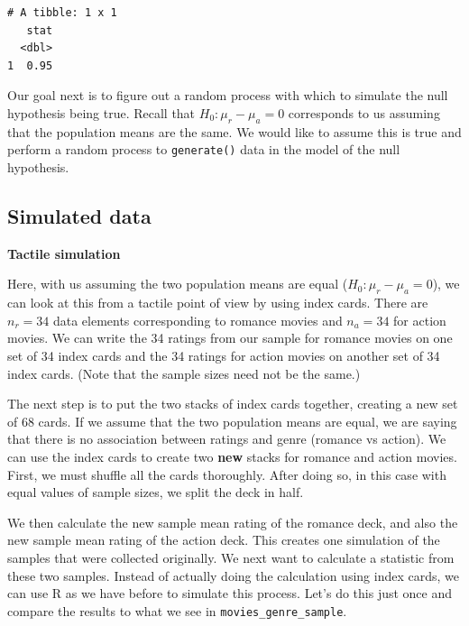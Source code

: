 \documentclass[12pt,]{krantz}
\makeatletter
\newenvironment{Shaded}{\begin{snugshade}}{\end{snugshade}}
\newcommand{\KeywordTok}[1]{\textcolor[rgb]{0.27,0.27,0.27}{\textbf{#1}}}
\newcommand{\DataTypeTok}[1]{\textcolor[rgb]{0.27,0.27,0.27}{#1}}
\newcommand{\StringTok}[1]{\textcolor[rgb]{0.5,0.5,0.5}{#1}}
\newcommand{\CommentTok}[1]{\textcolor[rgb]{0.37,0.37,0.37}{\textit{#1}}}
\newcommand{\OperatorTok}[1]{\textcolor[rgb]{0.43,0.43,0.43}{\textbf{#1}}}
\newcommand{\NormalTok}[1]{#1}
\newenvironment{kframe}{%
\medskip{}
\setlength{\fboxsep}{.8em}
 \def\at@end@of@kframe{}%
 \ifinner\ifhmode%
  \def\at@end@of@kframe{\end{minipage}}%
  \begin{minipage}{\columnwidth}%
 \fi\fi%
 \def\FrameCommand##1{\hskip\@totalleftmargin \hskip-\fboxsep
 \colorbox{shadecolor}{##1}\hskip-\fboxsep
     \hskip-\linewidth \hskip-\@totalleftmargin \hskip\columnwidth}%
 \MakeFramed {\advance\hsize-\width
   \@totalleftmargin\z@ \linewidth\hsize
   \@setminipage}}%
 {\par\unskip\endMakeFramed%
 \at@end@of@kframe}
\renewenvironment{Shaded}{\begin{kframe}}{\end{kframe}}
\makeatother
\begin{document}
\begin{verbatim}
# A tibble: 1 x 1
   stat
  <dbl>
1  0.95
\end{verbatim}

Our goal next is to figure out a random process with which to simulate
the null hypothesis being true. Recall that \(H_0: \mu_r - \mu_a = 0\)
corresponds to us assuming that the population means are the same. We
would like to assume this is true and perform a random process to
\texttt{generate()} data in the model of the null hypothesis.

\subsection{Simulated data}\label{simulated-data}

\textbf{Tactile simulation}

Here, with us assuming the two population means are equal
(\(H_0: \mu_r - \mu_a = 0\)), we can look at this from a tactile point
of view by using index cards. There are \(n_r = 34\) data elements
corresponding to romance movies and \(n_a = 34\) for action movies. We
can write the 34 ratings from our sample for romance movies on one set
of 34 index cards and the 34 ratings for action movies on another set of
34 index cards. (Note that the sample sizes need not be the same.)

The next step is to put the two stacks of index cards together, creating
a new set of 68 cards. If we assume that the two population means are
equal, we are saying that there is no association between ratings and
genre (romance vs action). We can use the index cards to create two
\textbf{new} stacks for romance and action movies. First, we must
shuffle all the cards thoroughly. After doing so, in this case with
equal values of sample sizes, we split the deck in half.

We then calculate the new sample mean rating of the romance deck, and
also the new sample mean rating of the action deck. This creates one
simulation of the samples that were collected originally. We next want
to calculate a statistic from these two samples. Instead of actually
doing the calculation using index cards, we can use R as we have before
to simulate this process. Let's do this just once and compare the
results to what we see in \texttt{movies\_genre\_sample}.

\begin{Shaded}
\end{Shaded}
\end{document}

